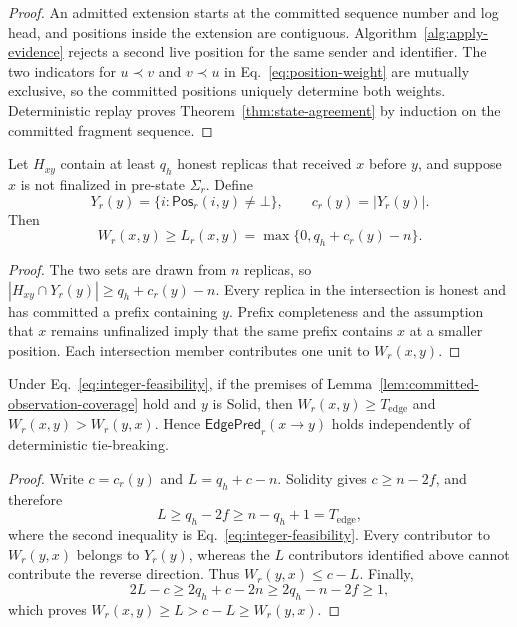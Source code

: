 \begin{proof}
An admitted extension starts at the committed sequence number and log head,
and positions inside the extension are contiguous.  Algorithm~\ref{alg:apply-evidence}
rejects a second live position for the same sender and identifier.  The two
indicators for $u\prec v$ and $v\prec u$ in Eq.~\eqref{eq:position-weight}
are mutually exclusive, so the committed positions uniquely determine both
weights.  Deterministic replay proves Theorem~\ref{thm:state-agreement} by
induction on the committed fragment sequence.
\end{proof}

\begin{lemma}
\label{lem:committed-observation-coverage}
Let $H_{xy}$ contain at least $q_h$ honest replicas that received $x$ before
$y$, and suppose $x$ is not finalized in pre-state $\Sigma_r$.  Define
\[
 Y_r(y)=\{i:\mathsf{Pos}_r(i,y)\ne\bot\},
 \qquad c_r(y)=|Y_r(y)|.
\]
Then
\[
 W_r(x,y)\ge L_r(x,y)
   =\max\{0,q_h+c_r(y)-n\}.
 \tag{15}\label{eq:coverage-lower-bound}
\]
\end{lemma}

\begin{proof}
The two sets are drawn from $n$ replicas, so
$|H_{xy}\cap Y_r(y)|\ge q_h+c_r(y)-n$.  Every replica in the intersection is
honest and has committed a prefix containing $y$.  Prefix completeness and
the assumption that $x$ remains unfinalized imply that the same prefix contains
$x$ at a smaller position.  Each intersection member contributes one unit to
$W_r(x,y)$.
\end{proof}

\begin{lemma}
\label{lem:fair-edge-formation}
Under Eq.~\eqref{eq:integer-feasibility}, if the premises of
Lemma~\ref{lem:committed-observation-coverage} hold and $y$ is Solid, then
$W_r(x,y)\ge T_{\mathrm{edge}}$ and
$W_r(x,y)>W_r(y,x)$.  Hence $\mathsf{EdgePred}_r(x\to y)$ holds independently
of deterministic tie-breaking.
\end{lemma}

\begin{proof}
Write $c=c_r(y)$ and $L=q_h+c-n$.  Solidity gives $c\ge n-2f$, and therefore
\[
 L\ge q_h-2f\ge n-q_h+1=T_{\mathrm{edge}},
\]
where the second inequality is Eq.~\eqref{eq:integer-feasibility}.  Every
contributor to $W_r(y,x)$ belongs to $Y_r(y)$, whereas the $L$ contributors
identified above cannot contribute the reverse direction.  Thus
$W_r(y,x)\le c-L$.  Finally,
\[
 2L-c\ge2q_h+c-2n\ge2q_h-n-2f\ge1,
\]
which proves $W_r(x,y)\ge L>c-L\ge W_r(y,x)$.
\end{proof}

